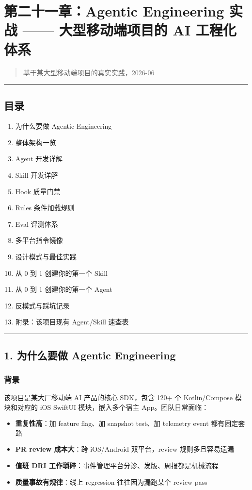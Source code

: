 \chapter{第二十一章：Agentic Engineering 实战 ------ 大型移动端项目的 AI 工程化体系}

\begin{quote}
基于某大型移动端项目的真实实践，2026-06\\
\end{quote}

\bigskip\hrule\bigskip

\section{目录}

\begin{enumerate}[leftmargin=2em]
\item 为什么要做 Agentic Engineering
\item 整体架构一览
\item Agent 开发详解
\item Skill 开发详解
\item Hook 质量门禁
\item Rules 条件加载规则
\item Eval 评测体系
\item 多平台指令镜像
\item 设计模式与最佳实践
\item 从 0 到 1 创建你的第一个 Skill
\item 从 0 到 1 创建你的第一个 Agent
\item 反模式与踩坑记录
\item 附录：该项目现有 Agent/Skill 速查表
\end{enumerate}

\bigskip\hrule\bigskip

\section{1. 为什么要做 Agentic Engineering}

\subsection{背景}

该项目是某大厂移动端 AI 产品的核心 SDK，包含 120+ 个 Kotlin/Compose 模块和对应的 iOS SwiftUI 模块，嵌入多个宿主 App。团队日常面临：


\begin{itemize}[leftmargin=2em]
\item \textbf{重复性高}：加 feature flag、加 snapshot test、加 telemetry event 都有固定套路
\item \textbf{PR review 成本大}：跨 iOS/Android 双平台，review 规则多且容易遗漏
\item \textbf{值班 DRI 工作琐碎}：事件管理平台分诊、发版、周报都是机械流程
\item \textbf{质量事故有规律}：线上 regression 往往因为漏跑某个 review pass
\end{itemize}

